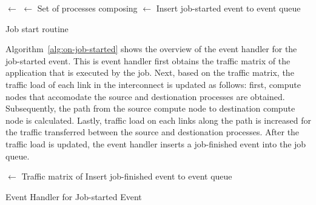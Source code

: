 \begin{algorithm}

    \Nodes $\gets$ \allocateNodes{\Job}\;
    \Procs $\gets$ Set of processes composing \Job\;
    \Mapping $\gets$ \mapProcs{\Procs, \Nodes}\;
    Insert job-started event to event queue\;

    \caption{Job start routine}%
    \label{alg:start-job}
\end{algorithm}

Algorithm~\ref{alg:on-job-started} shows the overview of the event handler for
the job-started event. This is event handler first obtains the traffic matrix
of the application that is executed by the job. Next, based on the traffic
matrix, the traffic load of each link in the interconnect is updated as
follows: first, compute nodes that accomodate the source and destionation
processes are obtained. Subsequently, the path from the source compute node to
destination compute node is calculated. Lastly, traffic load on each links
along the path is increased for the traffic transferred between the source and
destionation processes. After the traffic load is updated, the event handler
inserts a job-finished event into the job queue.

\begin{algorithm}

    \TrafficMatrix $\gets$ Traffic matrix of \Job\;
    Insert job-finished event to event queue\;

    \caption{Event Handler for Job-started Event}%
    \label{alg:on-job-started}
\end{algorithm}

